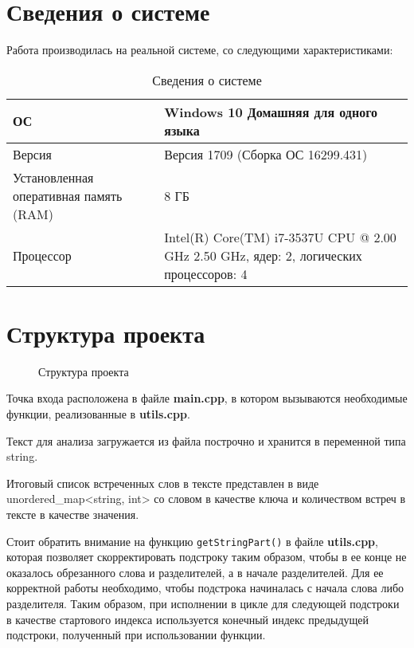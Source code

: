 \section{Сведения о системе}
Работа производилась на реальной системе, со следующими характеристиками:

\begin{table}[H]
	\centering
	\begin{tabular}{|M{5cm}|M{10cm}|}
		\hline ОС & Windows 10 Домашняя для одного языка     \\
		\hline Версия     & Версия 1709 (Сборка ОС 16299.431)  \\
		\hline Установленная оперативная память (RAM)     & 8 ГБ     \\
		\hline Процессор     & Intel(R) Core(TM) i7-3537U CPU @ 2.00 GHz 2.50 GHz, ядер: 2, логических процессоров: 4   \\
		\hline		
	\end{tabular}
	\caption{Сведения о системе}
	\label{tab:task}
\end{table}

\section{Структура проекта}

\begin{figure}[H]
	\centering
\caption{Структура проекта}
\end{figure}

Точка входа расположена в файле \textbf{main.cpp}, в котором вызываются необходимые функции, реализованные в \textbf{utils.cpp}.

Текст для анализа загружается из файла построчно и хранится в переменной типа string.

Итоговый список встреченных слов в тексте представлен в виде unordered\_map<string, int> со словом в качестве ключа и количеством встреч в тексте в качестве значения.

Стоит обратить внимание на функцию \texttt{getStringPart()} в файле \textbf{utils.cpp}, которая позволяет скорректировать подстроку таким образом, чтобы в ее конце не оказалось обрезанного слова и разделителей, а в начале разделителей. Для ее корректной работы необходимо, чтобы подстрока начиналась с начала слова либо разделителя. Таким образом, при исполнении в цикле для следующей подстроки в качестве стартового индекса используется конечный индекс предыдущей подстроки, полученный при использовании функции.

